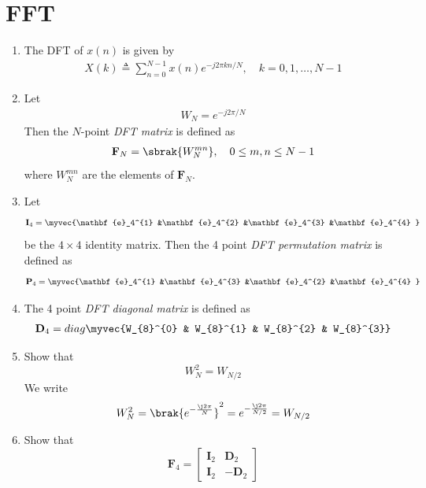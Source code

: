 \documentclass[journal,12pt,twocolumn]{IEEEtran}
\let\vec\mathbf
\renewcommand\thesection{\arabic{section}}
\begin{document}
\section{FFT}
\begin{enumerate}[label=\thesection.\arabic*.,ref=\thesection.\theenumi]
	\item The DFT of $x(n)$ is given by
	\begin{align}
		X(k) \triangleq \sum_{n=0}^{N-1} x(n) e^{-j 2 \pi k n / N}, \quad k=0,1, \ldots, N-1
	\end{align}
	\item Let 
	\begin{align}
		W_{N} = e^{-j2\pi/N} 
	\end{align}
	Then the $N$-point {\em DFT matrix} is defined as 
	\begin{align}
		\vec{F}_{N} = \sbrak{W_{N}^{mn}}, \quad 0 \le m,n \le N-1 
	\end{align}
	where $W_{N}^{mn}$ are the elements of $\vec{F}_{N}$.
	\item Let 
	\begin{align}
		\vec{I}_4 = \myvec{\vec{e}_4^{1} &\vec{e}_4^{2} &\vec{e}_4^{3} &\vec{e}_4^{4} }
	\end{align}
	be the $4\times 4$ identity matrix.  Then the 4 point {\em DFT permutation matrix} is defined as 
	\begin{align}
		\vec{P}_4 = \myvec{\vec{e}_4^{1} &\vec{e}_4^{3} &\vec{e}_4^{2} &\vec{e}_4^{4} }
	\end{align}
	\item The 4 point {\em DFT diagonal matrix} is defined as 
	\begin{align}
		\vec{D}_4 = diag\myvec{W_{8}^{0} & W_{8}^{1} & W_{8}^{2} & W_{8}^{3}}
	\end{align}
	\item Show that 
	\begin{equation}
		W_{N}^{2}=W_{N/2}
		\label{eq:n-2}
	\end{equation}
	\solution We write
	\begin{align}
		W_N^2 = \brak{e^{-\frac{\j2\pi}{N}}}^2 = e^{-\frac{\j2\pi}{N/2}} = W_{N/2}
	\end{align}
	\item Show that 
	\begin{equation}
		\vec{F}_{4}=
		\begin{bmatrix}
			\vec{I}_{2} & \vec{D}_{2} \\
			\vec{I}_{2} & -\vec{D}_{2}
		\end{bmatrix}

\end{equation}
\end{enumerate}
\end{document}
